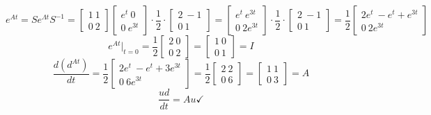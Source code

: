 \documentclass[11pt]{article}
\begin{document}
$$e^{At} = Se^{\Lambda t}S^{-1} = \begin{bmatrix} 1 \ 1 \\ 0 \ 2 \end{bmatrix}\begin{bmatrix} e^t \ 0 \\ 0 \ e^{3t} \end{bmatrix}\cdot \frac{1}{2} \cdot \begin{bmatrix} 2 \ -1 \\ 0 \ 1 \end{bmatrix} = \begin{bmatrix} e^t \ e^{3t} \\ 0 \ 2e^{3t} \end{bmatrix} \cdot \frac{1}{2} \cdot \begin{bmatrix} 2 \ -1 \\ 0 \ 1 \end{bmatrix} = \frac{1}{2} \begin{bmatrix} 2e^t \ -e^t+e^{3t} \\ 0 \ 2e^{3t} \end{bmatrix}$$
$$e^{At}|_{t=0} = \frac{1}{2} \begin{bmatrix} 2 \ 0 \\ 0 \ 2 \end{bmatrix} = \begin{bmatrix} 1 \ 0 \\ 0 \ 1 \end{bmatrix} = I $$
$$\frac{d(d^{At})}{dt} = \frac{1}{2} \begin{bmatrix} 2e^t \ -e^t+3e^{3t} \\ 0 \ 6e^{3t} \end{bmatrix} = \frac{1}{2} \begin{bmatrix} 2 \ 2 \\ 0 \ 6 \end{bmatrix} = \begin{bmatrix} 1 \ 1 \\ 0 \ 3 \end{bmatrix} = A $$
$$\frac{ud}{dt} = Au \checkmark $$
\end{document}
